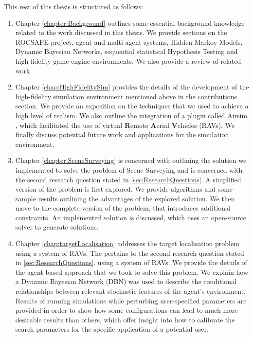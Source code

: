 This rest of this thesis is structured as follows: 
\begin{enumerate}
    \item Chapter \ref{chapter:Background} outlines some essential background knowledge related to the work discussed in this thesis. We provide sections on the ROCSAFE project, agent and multi-agent systems, Hidden Markov Models, Dynamic Bayesian Networks, sequential statistical Hypothesis Testing and high-fidelity game engine environments. We also provide a review of related work.
    \item Chapter \ref{chap:HighFidelitySim} provides the details of the development of the high-fidelity simulation environment mentioned above in the contributions section. We provide an exposition on the techniques that we used to achieve a high level of realism. We also outline the integration of a plugin called Airsim \cite{Shah2017AirSim:Vehicles}, which facilitated the use of virtual \textbf{R}emote \textbf{A}erial \textbf{V}ehicles (RAVs). We finally discuss potential future work and applications for the simulation environment.
    \item Chapter \ref{chapter:SceneSurveying} is concerned with outlining the solution we implemented to solve the problem of Scene Surveying and is concerned with the second research question stated in \ref{sec:ResearchQuestions}. A simplified version of the problem is first explored. We provide algorithms and some sample results outlining the advantages of the explored solution. We then move to the complete version of the problem, that introduces additional constraints. An implemented solution is discussed, which uses an open-source solver to generate solutions. 
    \item Chapter \ref{chap:targetLocalisation} addresses the target localisation problem using a system of RAVs. The pertains to the second research question stated in \ref{sec:ResearchQuestions}. using a system of RAVs. We provide the details of the agent-based approach that we took to solve this problem. We explain how a Dynamic Bayesian Network (DBN) was used to describe the conditional relationships between relevant stochastic features of the agent's environment. Results of running simulations while perturbing user-specified parameters are provided in order to show how some configurations can lead to much more desirable results than others, which offer insight into how to calibrate the search parameters for the specific application of a potential user.
    
\end{enumerate}